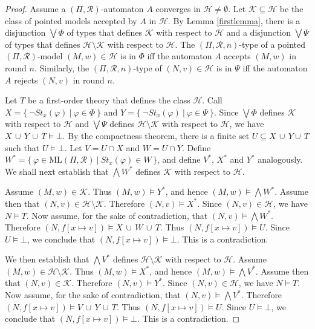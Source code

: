 \documentclass[copyright,creativecommons]{eptcs}
\begin{document}
\begin{proof}
Assume a $(\Pi,\mathcal{R})$-automaton $A$ converges in $\mathcal{H}\not=\emptyset$.
Let $\mathcal{K}\subseteq\mathcal{H}$ be the class of pointed models accepted by $A$ in $\mathcal{H}$.
By Lemma \ref{firstlemma}\hspace{0.4mm}, there is a
disjunction  $\bigvee\Phi$ of types that defines $\mathcal{K}$ with respect to $\mathcal{H}$
and a disjunction $\bigvee\Psi$ of types that defines $\mathcal{H}\setminus\mathcal{K}$ with respect to $\mathcal{H}$.
The $(\Pi,\mathcal{R},n)$-type of a pointed $(\Pi,\mathcal{R})$-model $(M,w)\in\mathcal{H}$ is in $\Phi$ iff
the automaton $A$ accepts $(M,w)$ in round $n$. Similarly, the $(\Pi,\mathcal{R},n)$-type of $(N,v)\in\mathcal{H}$
is in $\Psi$ iff the automaton $A$ rejects $(N,v)$ in round $n$.




Let $T$  be a first-order theory that defines the class $\mathcal{H}$.
Call $X = \{\  \neg \mathit{St}_x(\varphi)\ |\ \varphi\in\Phi\ \}$ and
$Y = \{\ \neg \mathit{St}_x(\varphi)\ |\ \varphi\in\Psi\ \}$. 
Since $\bigvee\Phi$ defines $\mathcal{K}$ with
respect to $\mathcal{H}$ and $\bigvee\Psi$ defines
$\mathcal{H}\setminus\mathcal{K}$ with
respect to $\mathcal{H}$, we have $X\, \cup\, Y\, \cup\, T\models\bot$.
By the compactness theorem, there is a finite set $U\subseteq X\, \cup\, Y\cup\, T$
such that $U\models \bot$.
Let $V=U\cap X$ and $W = U\cap Y$.
Define $W^* = \{\, \varphi\in\mathrm{ML}(\Pi,\mathcal{R})\ |\ \mathit{St}_x(\varphi)\in W\, \}$, 
and define $V^*$, $X^*$ and $Y^*$ analogously.
We shall next establish that $\bigwedge W^*$ defines $\mathcal{K}$ with respect to $\mathcal{H}$.




Assume $(M,w)\in\mathcal{K}$.
Thus $(M,w)\models Y^*$,
and hence $(M,w)\models\bigwedge W^*$.
Assume then that $(N,v)\in\mathcal{H}\setminus\mathcal{K}$.
Therefore $(N,v)\models X^*$.
Since $(N,v)\in\mathcal{H}$, we have $N\models T$.
Now assume, for the sake of contradiction, that $(N,v)\models\bigwedge W^*$.
Therefore $(N,f[x\mapsto v])\models X\, \cup\, W\, \cup\, T$. 
Thus $(N,f[x\mapsto v])\models U$.
Since $U\models\bot$, we conclude that $(N,f[x\mapsto v])\models \bot$.
This is a contradiction.




We then establish that $\bigwedge V^*$
defines $\mathcal{H}\setminus\mathcal{K}$
with respect to $\mathcal{H}$.
Assume $(M,w)\in\mathcal{H}\setminus\mathcal{K}$.
Thus $(M,w)\models X^*$,
and hence $(M,w)\models\bigwedge V^*$.
Assume then that $(N,v)\in\mathcal{K}$.
Therefore $(N,v)\models Y^*$.
Since $(N,v)\in\mathcal{H}$, we have $N\models T$.
Now assume, for the sake of contradiction, that $(N,v)\models\bigwedge V^*$.
Therefore $(N,f[x\mapsto v])\models V\, \cup\, Y\, \cup\, T$. 
Thus $(N,f[x\mapsto v])\models U$.
Since $U\models\bot$, we conclude that $(N,f[x\mapsto v])\models \bot$.
This is a contradiction.





\end{proof}
\end{document}
